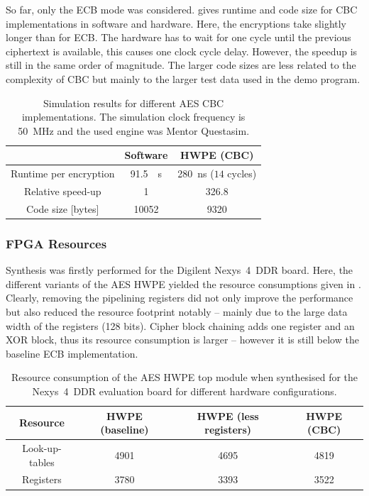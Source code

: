\documentclass[a4paper, 12pt]{article}
\begin{document}
So far, only the ECB mode was considered.  gives runtime and code size for CBC implementations in software and hardware. Here, the encryptions take slightly longer than for ECB. The hardware has to wait for one cycle until the previous ciphertext is available, this causes one clock cycle delay. However, the speedup is still in the same order of magnitude. The larger code sizes are less related to the complexity of CBC but mainly to the larger test data used in the demo program.

\begin{table}[h]
    \centering
    \begin{tabular}{c|c c}
        \toprule
         &  Software & HWPE (CBC)  \\
        \midrule
		Runtime per encryption & \SI{91.5}{\mu s} & \SI{280}{ns} ($14$ cycles) \\
		Relative speed-up & 1 & 326.8 \\
		Code size [bytes] & 10052 & 9320 \\
        \bottomrule
    \end{tabular}
	\label{tab:results-cbc}
	\caption{Simulation results for different AES CBC implementations. The simulation clock frequency is \SI{50}{MHz} and the used engine was Mentor Questasim.}
\end{table}

\subsubsection{FPGA Resources}

Synthesis was firstly performed for the Digilent Nexys~4~DDR board. Here, the different variants of the AES HWPE yielded the resource consumptions given in . Clearly, removing the pipelining registers did not only improve the performance but also reduced the resource footprint notably -- mainly due to the large data width of the registers (128 bits). Cipher block chaining adds one register and an XOR block, thus its resource consumption is larger -- however it is still below the baseline ECB implementation.

\begin{table}[h]
    \centering
    \begin{tabular}{c|c c c}
        \toprule
        Resource &  HWPE (baseline) & HWPE (less registers) & HWPE (CBC)  \\
        \midrule
		Look-up-tables & 4901 & 4695 & 4819 \\
		Registers & 3780 & 3393 & 3522 \\
        \bottomrule
    \end{tabular}
	\label{tab:results-nexys}
	\caption{Resource consumption of the AES HWPE top module when synthesised for the Nexys~4~DDR evaluation board for different hardware configurations.}
\end{table}
\end{document}
